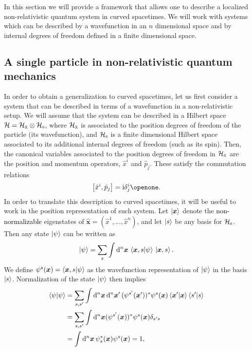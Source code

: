 \documentclass[prd,twocolumn,superscriptaddress,floatfix,amsmath,amssymb,amsfonts,longbibliography,nofootinbib]{revtex4-1}
\newcommand{\ii}{\mathrm{i}}
\newcommand{\tb}[1]{\textcolor{black}{#1}}
\begin{document}
In this section we will provide a framework that allows one to describe a localized non-relativistic quantum system in curved spacetimes. We will work with systems which can be described by a wavefunction in an $n$ dimensional space and by internal degrees of freedom defined in a finite dimensional space.

\subsection{A single particle in non-relativistic quantum mechanics}\label{sub:nonrel}

In order to obtain a generalization to curved spacetimes, let us first consider a system that can be described in terms of a wavefunction in a non-relativistic setup. We will assume that the system can be described in a Hilbert space $\mathcal{H} = \mathcal{H}_\textsc{x}\otimes\mathcal{H}_\textsc{s}$, where $\mathcal{H}_\textsc{x}$ is associated to the position degrees of freedom of the particle (its wavefunction), and $\mathcal{H}_\textsc{s}$ is a finite dimensional Hilbert space associated to its additional internal degrees of freedom (such as its spin). Then, the canonical variables associated to the position degrees of freedom in $\mathcal{H}_\textsc{x}$ are the position and momentum operators, $\hat{x}^i$ and $\hat{p}_j$. These satisfy the commutation relations
\begin{equation}\label{eq:xpcomm}
    \comm{\hat{x}^i}{\hat{p}_j} = \ii \delta^i_j\openone.
\end{equation}
In order to translate this description to curved spacetimes, it will be useful to work in the position representation of such system. Let $\ket{\bm x}$ denote the \tb{non-normalizable} eigenstates of $\hat{\bm x} = (\hat{x}^1,...,\hat{x}^n)$, and let $\ket{s}$ be any basis for $\mathcal{H}_\textsc{s}$. Then any state $\ket{\psi}$ can be written as
\begin{equation}
    \ket{\psi} = \sum_s \int \dd^n \bm x\, \braket{\bm x,s}{\psi}\,\ket{\bm x,s}.
\end{equation}
We define $\psi^s(\bm x) = \braket{\bm x,s}{\psi}$ as the wavefunction representation of $\ket{\psi}$ in the basis $\ket{s}$. Normalization of the state $\ket{\psi}$ then implies
\begin{align}
    \braket{\psi}{\psi} &= \sum_{s,s'} \int \dd^n \bm x\,\dd^n \bm x' \,(\psi^{s'}(\bm x'))^*\psi^s(\bm x) \braket{\bm x'}{\bm x}\braket{s'}{s}\nonumber\\
    &= \sum_{s,s'} \int \dd^n \bm x(\psi^{s'}(\bm x))^*\psi^s(\bm x) \delta_{s's}\nonumber\\
    &= \int \dd^n \bm x \,\psi_s^*(\bm x) \psi^s(\bm x)=1,
\end{align}
\end{document}
